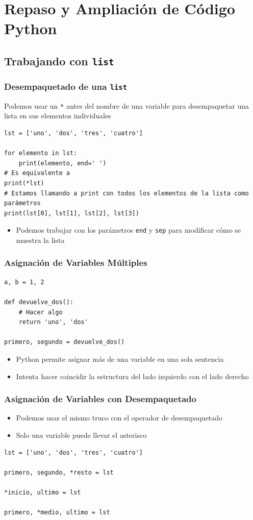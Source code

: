 \documentclass[11pt]{beamer}
\begin{document}
\section{Repaso y Ampliación de Código Python}

\subsection{Trabajando con \texttt{list}}

\begin{frame}[fragile]\frametitle{Desempaquetado de una \texttt{list}}
\begin{block}{}
Podemos usar un \lstinline|*| antes del nombre de una variable para desempaquetar una lista en sus elementos individuales
\end{block}
\begin{lstlisting}
lst = ['uno', 'dos', 'tres', 'cuatro']

for elemento in lst:
    print(elemento, end=' ')
# Es equivalente a
print(*lst)
# Estamos llamando a print con todos los elementos de la lista como parámetros
print(lst[0], lst[1], lst[2], lst[3])
\end{lstlisting}
\begin{itemize}
\item Podemos trabajar con los parámetros \lstinline|end| y \lstinline|sep| para modificar cómo se muestra la lista
\end{itemize}
\end{frame}

\begin{frame}[fragile]\frametitle{Asignación de Variables Múltiples}
\begin{lstlisting}
a, b = 1, 2

def devuelve_dos():
    # Hacer algo
    return 'uno', 'dos'

primero, segundo = devuelve_dos()
\end{lstlisting}
\begin{itemize}
\item Python permite asignar más de una variable en una sola sentencia
\item Intenta hacer coincidir la estructura del lado izquierdo con el lado derecho
\end{itemize}
\end{frame}

\begin{frame}[fragile]\frametitle{Asignación de Variables con Desempaquetado}
\begin{itemize}
\item Podemos usar el mismo truco con el operador de desempaquetado
\item Solo una variable puede llevar el asterisco
\end{itemize}
\begin{lstlisting}
lst = ['uno', 'dos', 'tres', 'cuatro']

primero, segundo, *resto = lst

*inicio, ultimo = lst

primero, *medio, ultimo = lst
\end{lstlisting}

\end{frame}
\end{document}
